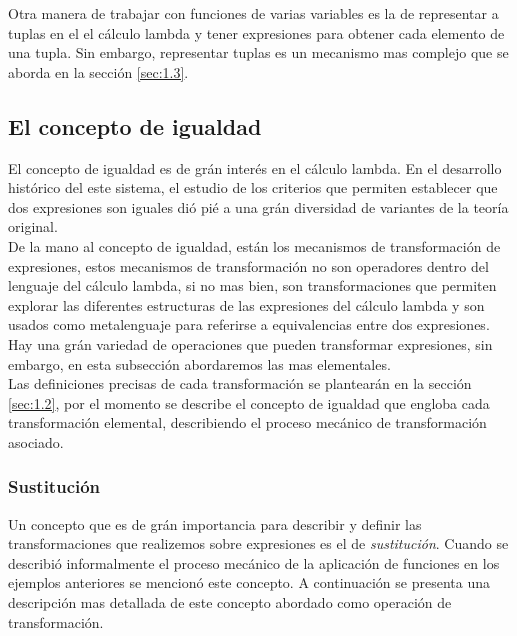 Otra manera de trabajar con funciones de varias variables es la de representar
a tuplas en el el cálculo lambda y tener expresiones para obtener cada elemento
de una tupla. Sin embargo, representar tuplas es un mecanismo mas complejo que
se aborda en la sección \ref{sec:1.3}.\\

\subsection{El concepto de igualdad} \label{sec:1.1.2}

El concepto de igualdad es de grán interés en el cálculo lambda. En el
desarrollo histórico del este sistema, el estudio de los criterios que permiten
establecer que dos expresiones son iguales dió pié a una grán diversidad de
variantes de la teoría original.\\

De la mano al concepto de igualdad, están los mecanismos de transformación de
expresiones, estos mecanismos de transformación no son operadores dentro del
lenguaje del cálculo lambda, si no mas bien, son transformaciones que permiten
explorar las diferentes estructuras de las expresiones del cálculo lambda y son
usados como metalenguaje para referirse a equivalencias entre dos expresiones. Hay
una grán variedad de operaciones que pueden transformar expresiones, sin embargo,
en esta subsección abordaremos las mas elementales.\\

Las definiciones precisas de cada transformación se plantearán en la sección
\ref{sec:1.2}, por el momento se describe el concepto de igualdad que engloba
cada transformación elemental, describiendo el proceso mecánico de
transformación asociado.\\

\subsubsection{Sustitución}

Un concepto que es de grán importancia para describir y definir las
transformaciones que realizemos sobre expresiones es el de \emph{sustitución}.
Cuando se describió informalmente el proceso mecánico de la aplicación de
funciones en los ejemplos anteriores se mencionó este concepto. A continuación
se presenta una descripción mas detallada de este concepto abordado como
operación de transformación.\\

